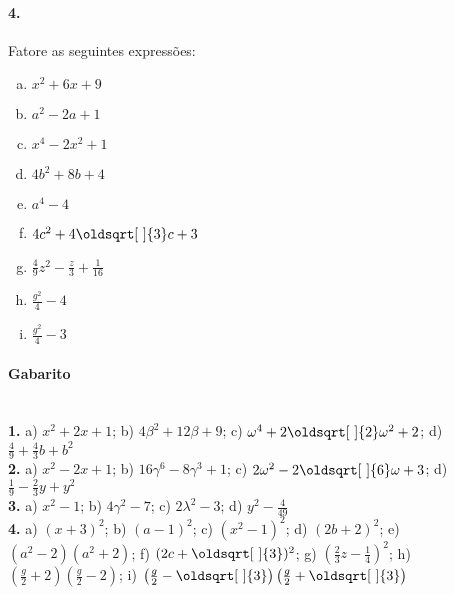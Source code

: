 \documentclass[a4paper,12pt]{article}
\renewcommand*{\sqrt}[2][\ ]{\oldsqrt[#1]{#2}}
\begin{document}
\begin{multicols}{2}
\paragraph{4.} Fatore as seguintes expressões:
\begin{enumerate}[a)]
\item $x^2 + 6x + 9$
\item $a^2 - 2a + 1$
\item $x^4 - 2x^2 + 1$
\item $4b^2 + 8b + 4$ 
\item $a^4 - 4$
\item $4c^2 + 4\sqrt{3}c + 3$
\item $\displaystyle \frac{4}{9}z^2 - \frac{z}{3} + \frac{1}{16}$
\item $\displaystyle \frac{g^2}{4} - 4$ 
\item $\displaystyle \frac{g^2}{4} - 3$ 
\end{enumerate}
\vspace*{3cm}
\end{multicols}
 
\vspace*{\fill}
{\footnotesize \color{darkgray}
\paragraph*{Gabarito} \hspace*{\fill}\\
\textbf{1.} a) $x^2 + 2x + 1$; b) $4\beta^2 + 12\beta + 9$; c) $\omega^4 + 2\sqrt{2}\omega^2 + 2$; d) $\frac{4}{9} + \frac{4}{3}b + b^2$\\
\textbf{2.} a) $x^2 - 2x + 1$; b) $16\gamma^6 - 8\gamma^3 + 1$; c) $2\omega^2 - 2\sqrt{6}\omega + 3$; d) $\frac{1}{9} - \frac{2}{3}y + y^2$\\
\textbf{3.} a) $x^2 - 1$; b) $4\gamma^2 - 7$; c) $2\lambda^2 - 3$; d) $y^2 - \frac{4}{49}$\\
\textbf{4.} a) $(x + 3)^2$; b) $(a-1)^2 $; c) $(x^2 - 1)^2$; d) $(2b + 2)^2$; e) $(a^2 - 2)(a^2 + 2)$; f) $(2c + \sqrt{3})^2$; g) $\left(\frac{2}{3}z - \frac{1}{4}\right)^2$; h) $\left(\frac{g}{2} + 2\right)\left(\frac{g}{2} - 2\right)$; i) $\left(\frac{g}{2} - \sqrt{3}\right)\left(\frac{g}{2} + \sqrt{3}\right)$
}
\end{document}
